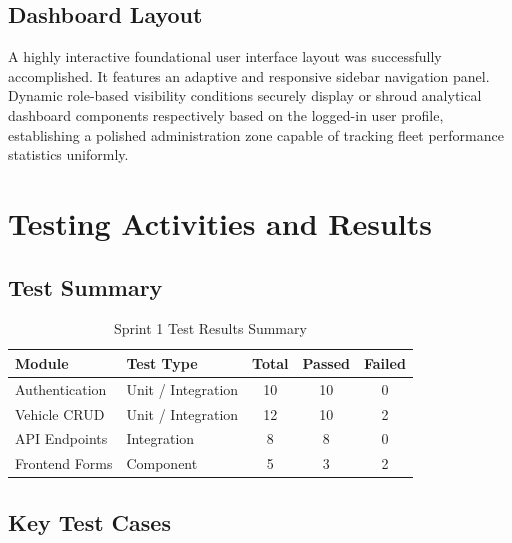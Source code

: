 \documentclass[12pt,a4paper]{article}
\newcommand{\thead}[1]{\textbf{\color{white}#1}}
\begin{document}
\subsection{Dashboard Layout}

A highly interactive foundational user interface layout was successfully accomplished. It features an adaptive and responsive sidebar navigation panel. Dynamic role-based visibility conditions securely display or shroud analytical dashboard components respectively based on the logged-in user profile, establishing a polished administration zone capable of tracking fleet performance statistics uniformly.

\section{Testing Activities and Results}

\subsection{Test Summary}

\begin{table}[H]
\centering
\renewcommand{\arraystretch}{1.3}
\begin{tabularx}{\textwidth}{|l|Y|c|c|c|}
\hline
{} \thead{Module} & \thead{Test Type} & \thead{Total} & \thead{Passed} & \thead{Failed} \\
\hline
Authentication  & Unit / Integration & 10 & 10 & 0 \\
\hline
{}
Vehicle CRUD    & Unit / Integration & 12 & 10 & 2 \\
\hline
API Endpoints   & Integration        & 8 & 8 & 0 \\
\hline
{}
Frontend Forms  & Component          & 5 & 3 & 2 \\
\hline
\end{tabularx}
\caption{Sprint 1 Test Results Summary}
\end{table}

\subsection{Key Test Cases}
\end{document}
